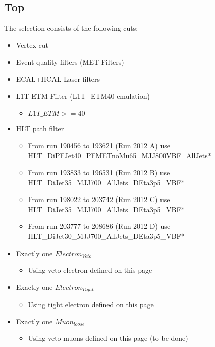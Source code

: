 


\subsection{Top}

The selection consists of the following cuts:
\begin{itemize}
  \item Vertex cut 
  \item Event quality filters (MET Filters)
  \item ECAL+HCAL Laser filters
  \item L1T ETM Filter (L1T\_ETM40 emulation)
  \begin{itemize}
    \item $ L1T\_ETM >= 40 $
  \end{itemize}
  \item HLT path filter
  \begin{itemize}
    \item From run 190456 to 193621 (Run 2012 A) use HLT\_DiPFJet40\_PFMETnoMu65\_MJJ800VBF\_AllJets* 
    \item From run 193833 to 196531 (Run 2012 B) use HLT\_DiJet35\_MJJ700\_AllJets\_DEta3p5\_VBF*
    \item From run 198022 to 203742 (Run 2012 C) use HLT\_DiJet35\_MJJ700\_AllJets\_DEta3p5\_VBF*
    \item From run 203777 to 208686 (Run 2012 D) use HLT\_DiJet30\_MJJ700\_AllJets\_DEta3p5\_VBF*
  \end{itemize}
  \item Exactly one $Electron_{Veto}$
  \begin{itemize}
    \item Using veto electron defined on this page
  \end{itemize}
  \item Exactly one $Electron_{Tight}$
  \begin{itemize}
    \item Using tight electron defined on this page
  \end{itemize}
  \item Exactly one $Muon_{loose}$
  \begin{itemize}
    \item Using veto muons defined on this page (to be done)
  \end{itemize}

\end{itemize}
